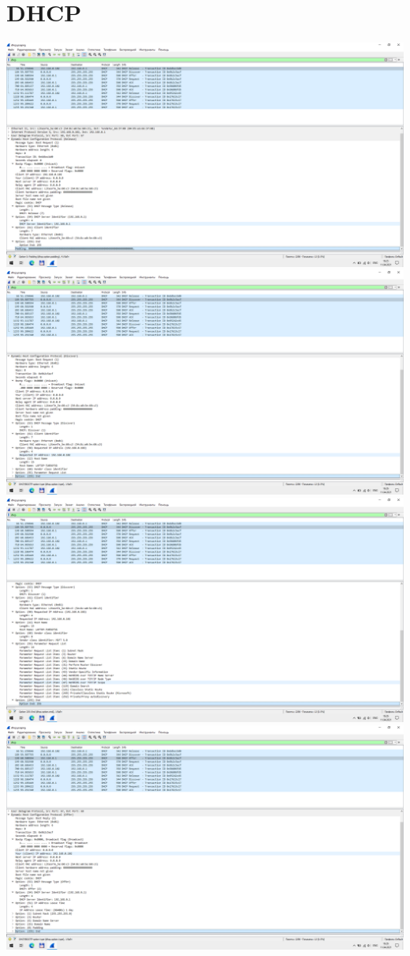 \section{DHCP}
\includegraphics{screenshots/dhcp_release_1}
\includegraphics{screenshots/dhcp_discover_1}
\includegraphics{screenshots/dhcp_discover_2}
\includegraphics{screenshots/dhcp_offer_1}
